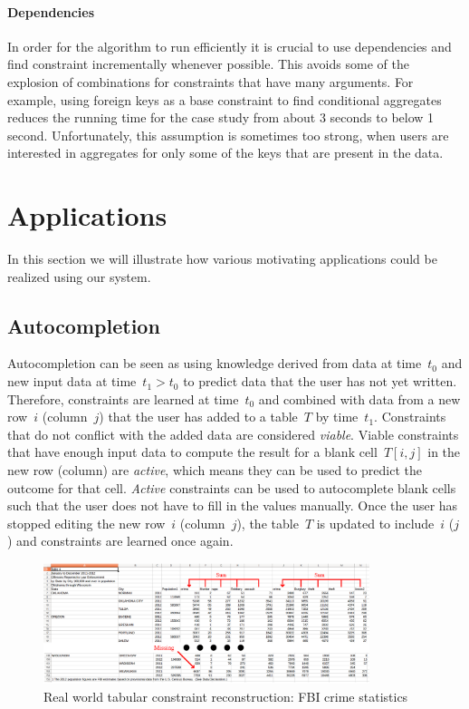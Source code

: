 \documentclass{sig-alternate-05-2015}
\begin{document}
\paragraph{Dependencies}
In order for the algorithm to run efficiently it is crucial to use dependencies and find constraint incrementally whenever possible.
This avoids some of the explosion of combinations for constraints that have many arguments.
For example, using foreign keys as a base constraint to find conditional aggregates reduces the running time for the case study from about 3 seconds to below 1 second.
Unfortunately, this assumption is sometimes too strong, when users are interested in aggregates for only some of the keys that are present in the data.

\section{Applications}\label{sec:applications}
In this section we will illustrate how various motivating applications could be realized using our system.

\subsection{Autocompletion}
Autocompletion can be seen as using knowledge derived from data at time~$t_0$ and new input data at time~$t_1 > t_0$ to predict data that the user has not yet written.
Therefore, constraints are learned at time~$t_0$ and combined with data from a new row~$i$ (column~$j$) that the user has added to a table~$T$ by time~$t_1$.
Constraints that do not conflict with the added data are considered \textit{viable}.
Viable constraints that have enough input data to compute the result for a blank cell~$T[i,j]$ in the new row (column) are \textit{active}, which means they can be used to predict the outcome for that cell.
\textit{Active} constraints can be used to autocomplete blank cells such that the user does not have to fill in the values manually.
Once the user has stopped editing the new row~$i$ (column~$j$), the table~$T$ is updated to include~$i$ ($j$) and constraints are learned once again.

\begin{figure}[thb]
  \begin{center}
    \includegraphics[width=0.85\textwidth]{figures/fbi_figure_highlighted.png}
  \end{center}
  \caption{Real world tabular constraint reconstruction: FBI crime statistics}
  \label{fig:fbi}
\end{figure}
\end{document}
